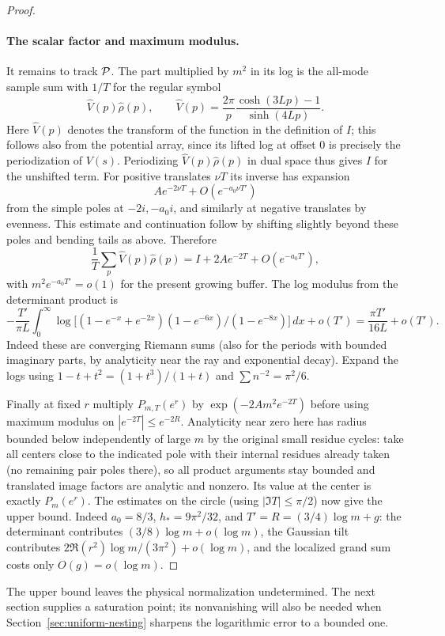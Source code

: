 \begin{proof}
\paragraph{The scalar factor and maximum modulus.}
It remains to track \({\cal P}\). The part multiplied by \(m^2\) in its log is the all-mode sample sum with \(1/T\) for the regular symbol
\begin{equation}\label{eq:gas-bulk-symbol}
 \widehat V(p)\widehat\rho(p),\qquad \widehat V(p)=\frac{2\pi}{p}\frac{\cosh(3Lp)-1}{\sinh(4Lp)} .
\end{equation}
Here \(\widehat V(p)\) denotes the transform of the function in the definition of \(I\); this follows also from the potential array, since its lifted log at offset 0 is precisely the periodization of \(V(s)\). Periodizing \(\widehat V(p)\widehat\rho(p)\) in dual space thus gives \(I\) for the unshifted term. For positive translates \(\nu T\) its inverse has expansion
\[
 A e^{-2\nu T}+O(e^{-a_0\nu T'})
\]
from the simple poles at \(-2i,-a_0 i\), and similarly at negative translates by evenness. This estimate and continuation follow by shifting slightly beyond these poles and bending tails as above. Therefore
\begin{equation}\label{eq:gas-bulk-period-correction}
 \frac1T\sum_p\widehat V(p)\widehat\rho(p)
 =I+2A e^{-2T}+O(e^{-a_0T'}),
\end{equation}
with \(m^2 e^{-a_0T'}=o(1)\) for the present growing buffer.
The log modulus from the determinant product is
\begin{equation}\label{eq:gas-determinant-rate}
 -\frac{T'}{\pi L}\int_0^\infty
 \log\big[(1-e^{-x}+e^{-2x})(1-e^{-6x})/(1-e^{-8x})\big]\,dx
 +o(T')=\frac{\pi T'}{16L}+o(T').
\end{equation}
Indeed these are converging Riemann sums (also for the periods with bounded imaginary parts, by analyticity near the ray and exponential decay). Expand the logs using \(1-t+t^2=(1+t^3)/(1+t)\) and \(\sum n^{-2}=\pi^2/6\).

Finally at fixed \(r\) multiply \(P_{m,T}(e^r)\) by
\(\exp(-2A m^2 e^{-2T})\) before using maximum modulus on
\(|e^{-2T}|\le e^{-2R}\). Analyticity near zero here has radius bounded below independently of large \(m\) by the original small residue cycles: take all centers close to the indicated pole with their internal residues already taken (no remaining pair poles there), so all product arguments stay bounded and translated image factors are analytic and nonzero. Its value at the center is exactly \(P_m(e^r)\). The estimates on the circle (using \(|\Im T|\le\pi/2\)) now give the upper bound. Indeed
\(a_0=8/3\), \(h_*=9\pi^2/32\), and
\(T'=R=(3/4)\log m+g\): the determinant contributes
\((3/8)\log m+o(\log m)\), the Gaussian tilt contributes
\(2\Re(r^2)\log m/(3\pi^2)+o(\log m)\), and the localized
grand sum costs only \(O(g)=o(\log m)\).
\end{proof}

The upper bound leaves the physical normalization undetermined. The next section supplies a saturation point; its nonvanishing will also be needed when Section~\ref{sec:uniform-nesting} sharpens the logarithmic error to a bounded one.
